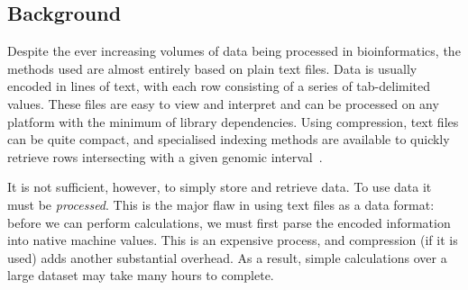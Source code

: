 \documentclass[10pt]{bmc_article}
\newenvironment{bmcformat}{\begin{raggedright}\baselineskip20pt\sloppy\setboolean{publ}{false}}{\end{raggedright}\baselineskip20pt\sloppy}
\begin{document}
\begin{bmcformat}


\section*{Background} 

%
Despite the ever increasing volumes of data being processed in bioinformatics,
the methods used are almost entirely based on plain text files. Data is 
usually encoded in lines of text, with each row consisting of a series of tab-delimited 
values.
These files are easy to view and interpret and can be processed on 
any platform with the minimum of library dependencies. Using compression,
text files can be quite compact, and specialised indexing methods 
are available to quickly retrieve rows intersecting with a 
given genomic interval~\cite{li11}.

It is not sufficient, however, to simply store and retrieve data. To use data
it must be \emph{processed}. This is the major flaw in 
using text files as a data format: before we can perform calculations, we 
must first parse the encoded information into native 
machine values. This is an expensive process, and 
compression (if it is used) adds another substantial overhead. 
As a result,  simple calculations over a large dataset may take 
many hours to complete.


\end{bmcformat}
\end{document}

